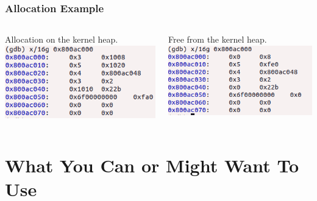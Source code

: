 \documentclass{beamer}
\begin{document}
\begin{frame}[fragile]
  \frametitle{Allocation Example}
  \begin{columns}
    \begin{column}{0.5\textwidth}
      Allocation on the kernel heap.
      \includegraphics[width=\textwidth]{alloc_vmalloc.png}
    \end{column}
    \begin{column}{0.5\textwidth}
      Free from the kernel heap.
      \includegraphics[width=\textwidth]{free_vmalloc.png}
    \end{column}
  \end{columns}
\end{frame}

\section{What You Can or Might Want To Use}
\end{document}
